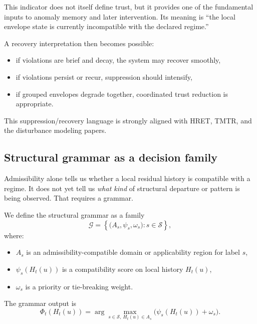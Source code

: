 \documentclass[11pt]{article}
\theoremstyle{definition}
\theoremstyle{plain}
\begin{document}
This indicator does not itself define trust, but it provides one of the fundamental inputs to anomaly memory and later intervention. Its meaning is “the local envelope state is currently incompatible with the declared regime.”

A recovery interpretation then becomes possible:
\begin{itemize}[leftmargin=1.5em]
    \item if violations are brief and decay, the system may recover smoothly,
    \item if violations persist or recur, suppression should intensify,
    \item if grouped envelopes degrade together, coordinated trust reduction is appropriate.
\end{itemize}

This suppression/recovery language is strongly aligned with HRET, TMTR, and the disturbance modeling papers. 


\subsection{Structural grammar as a decision family}

Admissibility alone tells us whether a local residual history is compatible with a regime. It does not yet tell us \emph{what kind} of structural departure or pattern is being observed. That requires a grammar.

We define the structural grammar as a family
\begin{equation}
\mathcal G=
\left\{
\bigl(A_s,\psi_s,\omega_s\bigr): s\in\mathcal S
\right\},
\end{equation}
where:
\begin{itemize}[leftmargin=1.5em]
    \item $A_s$ is an admissibility-compatible domain or applicability region for label $s$,
    \item $\psi_s(H_t(u))$ is a compatibility score on local history $H_t(u)$,
    \item $\omega_s$ is a priority or tie-breaking weight.
\end{itemize}

The grammar output is
\begin{equation}
\Phi_t(H_t(u))=
\arg\max_{s\in\mathcal S,\ H_t(u)\in A_s}
\bigl(\psi_s(H_t(u))+\omega_s\bigr).
\end{equation}
\end{document}

